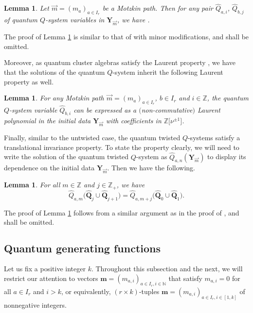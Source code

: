 \documentclass[10pt,a4paper]{amsart}
\numberwithin{equation}{section}
\newtheorem{Lemma}[Theorem]{Lemma}
\begin{document}
\begin{Lemma}\label{4.1}
Let $\vec{m}=(m_a)_{a\in I_r}$ be a Motzkin path. Then for any pair $\widehat{Q}_{a,i}$, $\widehat{Q}_{b,j}$ of quantum $Q$-system variables in $\mathbf{Y}_{\vec{m}}$, we have
.
\end{Lemma}

The proof of Lemma \ref{4.1} is similar to that of \cite[Lemma~3.2]{DFK14} with minor modifications, and shall be omitted.

Moreover, as quantum cluster algebras satisfy the Laurent property \cite[Corollary~5.2]{BZ05}, we have that the solutions of the quantum $Q$-system inherit the following Laurent property as well.

\begin{Lemma}\label{4.2}
For any Motzkin path $\vec{m}=(m_a)_{a\in I_r}$, $b\in I_r$ and $i\in\mathbb{Z}$, the quantum $Q$-system variable $\widehat{Q}_{b,i}$ can be expressed as a $($non-commutative$)$ Laurent polynomial in the initial data $\mathbf{Y}_{\vec{m}}$ with coefficients in $\mathbb{Z}\bigl[\nu^{\pm1}\bigr]$.
\end{Lemma}

Finally, similar to the untwisted case, the quantum twisted $Q$-systems satisfy a translational invariance property. To state the property clearly, we will need to write the solution of the quantum twisted $Q$-system as $\widehat{Q}_{a,n}(\mathbf{Y}_{\vec{m}})$ to display its dependence on the initial data $\mathbf{Y}_{\vec{m}}$. Then we have the following.

\begin{Lemma}\label{4.3}
For all $m\in\mathbb{Z}$ and $j\in\mathbb{Z}_+$, we have
\[
\widehat{Q}_{a,m}\bigl(\widehat{\mathbf{Q}}_j\cup\widehat{ \mathbf{Q}}_{j+1}\bigr)
=\widehat{Q}_{a,m+j}\bigl(\widehat{\mathbf{Q}}_0\cup\widehat{ \mathbf{Q}}_1\bigr).
\]
\end{Lemma}

The proof of Lemma \ref{4.3} follows from a similar argument as in the proof of \cite[Lemma 4.10]{DFK14}, and shall be omitted.

\subsection{Quantum generating functions}\label{Section 4.2}

Let us fix a positive integer $k$. Throughout this subsection and the next, we will restrict our attention to vectors $\mathbf{m}=(m_{a,i})_{a\in I_r,i\in\mathbb{N}}$ that satisfy $m_{a,i}=0$ for all $a\in I_r$ and $i>k$, or equivalently, $(r\times k)$-tuples $\mathbf{m}=(m_{a,i})_{a\in I_r,i\in[1,k]}$ of nonnegative integers.
\end{document}
